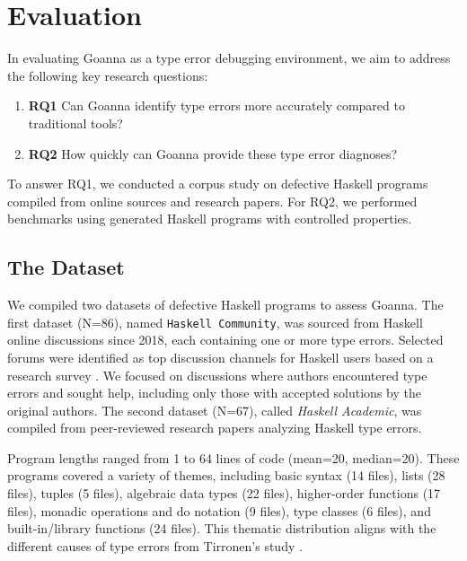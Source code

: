 \documentclass[pdflatex,sn-mathphys-num]{sn-jnl}%
\begin{document}
\section{Evaluation} \label{sec:evaluation}

In evaluating Goanna as a type error debugging environment, we aim to address the following key research questions:

\begin{enumerate}
    \item \textbf{RQ1} Can Goanna identify type errors more accurately compared to traditional tools?
    \item \textbf{RQ2} How quickly can Goanna provide these type error diagnoses?
\end{enumerate}

To answer RQ1, we conducted a corpus study on defective Haskell programs compiled from online sources and research papers. For RQ2, we performed benchmarks using generated Haskell programs with controlled properties.

\subsection{The Dataset} \label{sub:dataset}

We compiled two datasets of defective Haskell programs to assess Goanna. The first dataset (N=86), named \texttt{Haskell Community}, was sourced from Haskell online discussions since 2018, each containing one or more type errors. Selected forums were identified as top discussion channels for Haskell users based on a research survey \cite{Fausak2022-zf}. We focused on discussions where authors encountered type errors and sought help, including only those with accepted solutions by the original authors. The second dataset (N=67), called \textit{Haskell Academic}, was compiled from peer-reviewed research papers analyzing Haskell type errors.

Program lengths ranged from 1 to 64 lines of code (mean=20, median=20). These programs covered a variety of themes, including basic syntax (14 files), lists (28 files), tuples (5 files), algebraic data types (22 files), higher-order functions (17 files), monadic operations and do notation (9 files), type classes (6 files), and built-in/library functions (24 files). This thematic distribution aligns with the different causes of type errors from Tirronen's study \cite{Tirronen2015-nr}.
\end{document}
